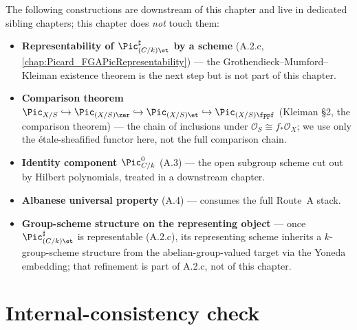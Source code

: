 The following constructions are downstream of this chapter and live in
dedicated sibling chapters; this chapter does \emph{not} touch them:
\begin{itemize}
  \item \textbf{Representability of \(\Pic^\sharp_{(C/k)\et}\) by a scheme}
    (A.2.c, \cref{chap:Picard_FGAPicRepresentability}) --- the
    Grothendieck--Mumford--Kleiman existence theorem is the next step but is
    not part of this chapter.
  \item \textbf{Comparison theorem $\Pic_{X/S} \hookrightarrow
    \Pic_{(X/S)\zar} \hookrightarrow \Pic_{(X/S)\et} \hookrightarrow
    \Pic_{(X/S)\fppf}$} (Kleiman \S 2, the comparison theorem) --- the chain of inclusions
    under \(\mathcal{O}_S \cong f_*\mathcal{O}_X\); we use only the
    \'etale-sheafified functor here, not the full comparison chain.
  \item \textbf{Identity component \(\Pic^0_{C/k}\)} (A.3) --- the open subgroup
    scheme cut out by Hilbert polynomials, treated in a downstream chapter.
  \item \textbf{Albanese universal property} (A.4) --- consumes the full
    Route~A stack.
  \item \textbf{Group-scheme structure on the representing object} --- once
    \(\Pic^\sharp_{(C/k)\et}\) is representable (A.2.c), its representing scheme
    inherits a \(k\)-group-scheme structure from the abelian-group-valued
    target via the Yoneda embedding; that refinement is part of A.2.c, not
    of this chapter.
\end{itemize}

\section{Internal-consistency check}
\label{sec:relpic_consistency_check}

